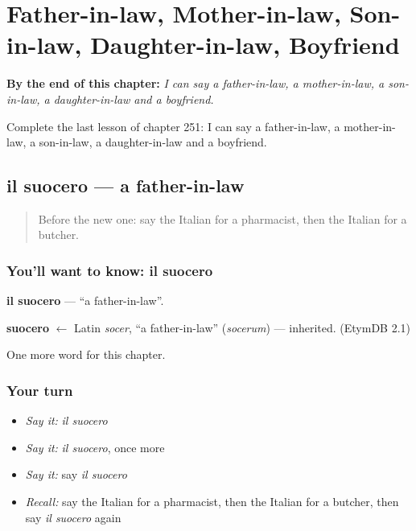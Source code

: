 
\chapter{Father-in-law, Mother-in-law, Son-in-law, Daughter-in-law, Boyfriend}
\label{ch:it-father-in-law-mother-in-law-son-in-law-daughter-in-law-boyfriend}

\begin{chapteropening}
\textbf{By the end of this chapter:} \emph{I can say a father-in-law, a mother-in-law, a son-in-law, a daughter-in-law and a boyfriend.}

Complete the last lesson of chapter 251: I can say a father-in-law, a mother-in-law, a son-in-law, a daughter-in-law and a boyfriend.
\end{chapteropening}

\section[il suocero]{il suocero — a father-in-law}

\label{lesson:IT-C251-suocero}



\begin{quote}
Before the new one: say the Italian for a pharmacist, then the Italian for a butcher.
\end{quote}

\subsection*{You'll want to know: il suocero}
\textbf{il suocero} — \textquotedblleft{}a father-in-law\textquotedblright{}.

\begin{cousinweb}
\textbf{suocero} $\leftarrow$ Latin \emph{socer}, \textquotedblleft{}a father-in-law\textquotedblright{} (\emph{socerum}) — inherited. (EtymDB 2.1)
\end{cousinweb}

\begin{grammarlens}[title={What you've built}]
One more word for this chapter.
\end{grammarlens}

\subsection*{Your turn}
\begin{itemize}
\raggedright
  \item \emph{Say it:} \emph{il suocero}
  \item \emph{Say it:} \emph{il suocero}, once more
  \item \emph{Say it:} say \emph{il suocero}
  \item \emph{Recall:} say the Italian for a pharmacist, then the Italian for a butcher, then say \emph{il suocero} again
\end{itemize}

